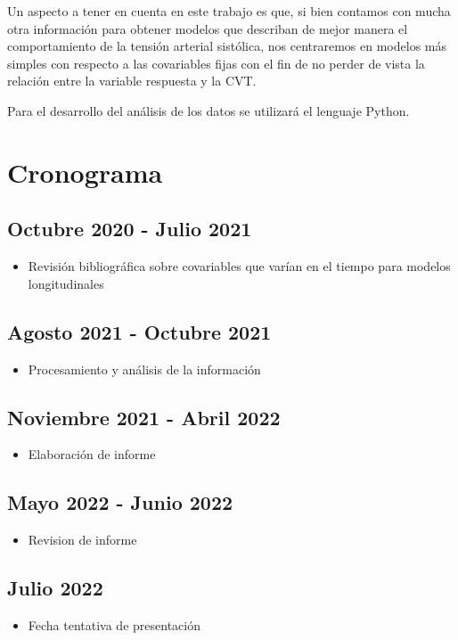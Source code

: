 \documentclass[12pt]{article}
\begin{document}
Un aspecto a tener en cuenta en este trabajo es que, si bien contamos con mucha otra información para obtener modelos
que describan de mejor manera el comportamiento de la tensión arterial sistólica, nos centraremos en modelos más simples con
respecto a las covariables fijas con el fin de no perder de vista la relación entre la variable respuesta y la CVT.

Para el desarrollo del análisis de los datos se utilizará el lenguaje Python.

\newpage
\section{Cronograma}

\subsection*{Octubre 2020 - Julio 2021}
\begin{itemize}
	\item Revisión bibliográfica sobre covariables que varían en el tiempo para modelos longitudinales
\end{itemize}

\subsection*{Agosto 2021 - Octubre 2021}
\begin{itemize}
	\item Procesamiento y análisis de la información 
\end{itemize}

\subsection*{Noviembre 2021 - Abril 2022}
\begin{itemize}
	\item Elaboración de informe
\end{itemize}

\subsection*{Mayo 2022 - Junio 2022}
\begin{itemize}
	\item Revision de informe
\end{itemize}

\subsection*{Julio 2022}
\begin{itemize}
	\item Fecha tentativa de presentación
\end{itemize}

\newpage
\nocite{*}
\renewcommand{\refname}{Bibliografía}

\end{document}
